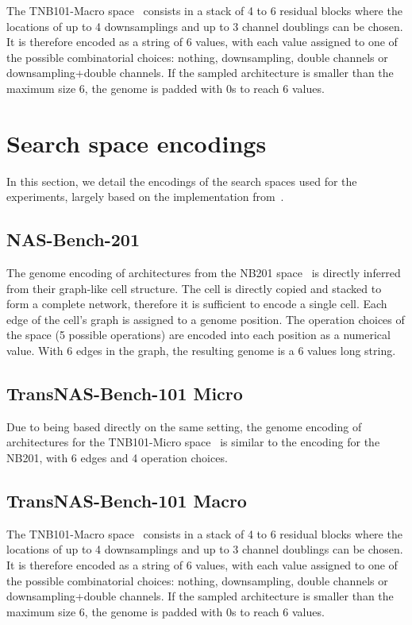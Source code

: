 \documentclass[10pt]{article} %
\begin{document}
The TNB101-Macro space~\citep{duan2021transnas} consists in a stack of 4 to 6 residual blocks where the locations of up to 4 downsamplings and up to 3 channel doublings can be chosen. It is therefore encoded as a string of 6 values, with each value assigned to one of the possible combinatorial choices: nothing, downsampling, double channels or downsampling+double channels. If the sampled architecture is smaller than the maximum size 6, the genome is padded with 0s to reach 6 values.

\section{Search space encodings}
\label{apx_encodings}

In this section, we detail the encodings of the search spaces used for the experiments, largely based on the implementation from~\citet{krishnakumar2022bench}.

\subsection{NAS-Bench-201}

The genome encoding of architectures from the NB201 space~\citep{dong2020bench} is directly inferred from their graph-like cell structure. The cell is directly copied and stacked to form a complete network, therefore it is sufficient to encode a single cell. Each edge of the cell's graph is assigned to a genome position. The operation choices of the space (5 possible operations) are encoded into each position as a numerical value. With 6 edges in the graph, the resulting genome is a 6 values long string.

\subsection{TransNAS-Bench-101 Micro}

Due to being based directly on the same setting, the genome encoding of architectures for the TNB101-Micro space~\citep{duan2021transnas} is similar to the encoding for the NB201, with 6 edges and 4 operation choices.

\subsection{TransNAS-Bench-101 Macro}

The TNB101-Macro space~\citep{duan2021transnas} consists in a stack of 4 to 6 residual blocks where the locations of up to 4 downsamplings and up to 3 channel doublings can be chosen. It is therefore encoded as a string of 6 values, with each value assigned to one of the possible combinatorial choices: nothing, downsampling, double channels or downsampling+double channels. If the sampled architecture is smaller than the maximum size 6, the genome is padded with 0s to reach 6 values.
\end{document}

